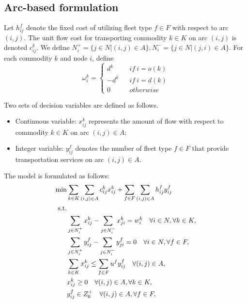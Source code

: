 \documentclass[11pt,nonblindrev,fleqn]{article}
\begin{document}
\subsection{Arc-based formulation}
Let  $h_{ij}^f$ denote the fixed cost of utilizing fleet type $f\in F$ with respect to arc $(i,j)$. The unit flow cost for transporting commodity $k\in K$ on arc $(i,j)$ is denoted $c_{ij}^k$. We define $N_i^+= \{j\in N|(i,j)\in A\},N_i^-= \{j\in N|(j,i)\in A\}$. For each commodity $k$ and node $i$, define
\begin{equation*}
\omega_i^k= \left\{
\begin{aligned}
d^k&  & if \ i=o(k) \\
-d^k&  & if \ i=d(k) \\
0&  & otherwise
\end{aligned}
\right.
\end{equation*}

Two sets of decision variables are defined as follows.
\begin{itemize}
  \item Continuous variable: $x_{ij}^k$ represents the amount of flow with respect to commodity $k\in K$ on arc $(i,j)\in A$;
  \item Integer variable: $y_{ij}^f$ denotes the number of fleet type $f\in F$ that provide transportation services on arc $(i,j)\in A$.
\end{itemize}

The model is formulated as follows:
\begin{align}
  \min &  \sum_{k\in K}\sum_{(i,j)\in A} c_{ij}^k x_{ij}^k + \sum_{f\in F}\sum_{(i,j)\in A}h_{ij}^f y_{ij}^f   \label{objA}  \\
  \rm{s.t.} \nonumber  \\
         &  \sum_{j\in N_i^+}x_{ij}^k - \sum_{j\in N_i^-}x_{ji}^k = w_i^k     \quad     \forall i\in N, \forall k\in K,     \label{demandA}  \\
         &   \sum_{j\in N_i^+}y_{ij}^f - \sum_{j\in N_i^-}y_{ji}^f = 0  \quad     \forall i\in N, \forall f\in F,   \label{dbA} \\
         &   \sum_{k\in K}x_{ij}^k \leq \sum_{f\in F}u^f y_{ij}^f  \quad  \forall (i,j)\in A,   \label{capacityA} \\
         &    x_{ij}^k \geq 0  \quad  \forall (i,j)\in A, \forall k\in K,   \label{xA} \\
         &   y_{ij}^f \in Z_0^+  \quad  \forall (i,j)\in A,\forall f\in F, \label{yA}
\end{align}
\end{document}
